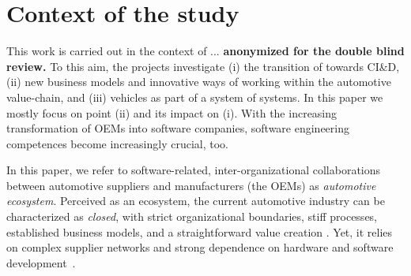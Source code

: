 \section{Context of the study}\label{sec:context}


This work is carried out in the context of ... {\bf anonymized for the double blind review.}
To this aim, the projects investigate (i) the transition of \company{} %
towards CI\&D, (ii) new business models and innovative ways of working within the automotive %
value-chain, %
and (iii) vehicles as part of a system of systems. 
In this paper we mostly focus on point (ii) %
and its impact on (i). %
With the increasing transformation of OEMs into software companies, software engineering competences become increasingly crucial, too.

{In this paper, we refer to software-related, }%
inter-organizational collaborations between automotive suppliers %
{and manufacturers (the OEMs) as \emph{automotive ecosystem}}. %
Perceived as an ecosystem, the current automotive industry can be characterized as \emph{closed}, with strict organizational boundaries, stiff processes, established business models, and a straightforward value creation \cite{ConnectedVehicle2012}.
Yet, it relies on complex supplier networks  and strong dependence on hardware and software development~\cite{Knauss2014d}. %



